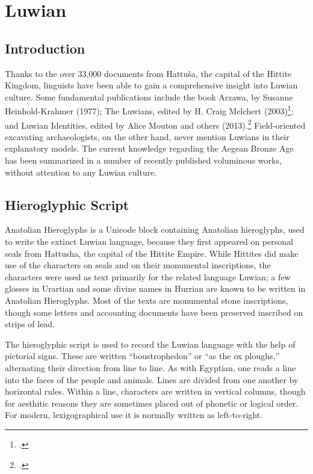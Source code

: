 \chapter{Luwian}
\newfontfamily{}

\section{Introduction}

Thanks to the over 33,000 documents from Hattuša, the capital of the Hittite Kingdom, linguists have been able to gain a comprehensive insight into Luwian culture. Some fundamental publications include the book Arzawa, by Susanne Heinhold-Krahmer (1977); The Luwians, edited by H. Craig Melchert (2003)\footcite{Melchert2003}; and Luwian Identities, edited by Alice Mouton and others (2013).\footcite{Mouton2013} Field-oriented excavating archaeologists, on the other hand, never mention Luwians in their explanatory models. The current knowledge regarding the Aegean Bronze Age has been summarized in a number of recently published voluminous works, without attention to any Luwian culture. 

 


\section{Hieroglyphic Script}
Anatolian Hieroglyphs is a Unicode block containing Anatolian hieroglyphs, used to write the extinct Luwian language, because they first appeared on personal seals from Hattusha, the capital of the Hittite Empire. While
Hittites did make use of the characters on seals and on their monumental inscriptions, the characters were
used as text primarily for the related language Luwian; a few glosses in Urartian and some divine names
in Hurrian are known to be written in Anatolian Hieroglyphs. Most of the texts are monumental stone
inscriptions, though some letters and accounting documents have been preserved inscribed on strips of
lead.

The hieroglyphic script is used to record the Luwian language with the help
of pictorial signs. These are written “boustrophedon” or “as the ox ploughs,”
alternating their direction from line to line. As with Egyptian, one reads a line into the faces of the people and animals. Lines are divided from one another by horizontal rules. Within a line, characters are written in vertical columns, though for aesthitic reasons they are sometimes placed out of phonetic or logical order. For modern, lexigographical use it is  normally written as left-to-right.



